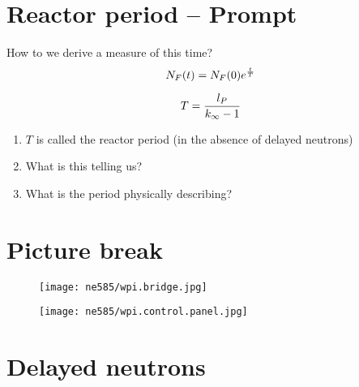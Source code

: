 \documentclass[aspectratio=1610,pdftex,dvipsnames,compress,xcolor={dvipsnames}]{beamer}
\begin{document}
\section{Reactor period -- Prompt}


\addtocounter{framenumber}{-1} 
\begin{frame}{How to we derive a measure of this time?}
    \begin{equation}
        \LARGE
        N_F(t)=N_F(0)e^{\frac{t}{T}}
    \end{equation}

    \begin{equation}
        \LARGE
        T = \frac{l_P}{k_\infty - 1}
    \end{equation}

    \vspace*{\fill}

    \begin{enumerate}[series=outerlist,topsep=0pt,itemsep=21pt,leftmargin=*,label=(\arabic*)]
        \item[]$T$ is called the reactor period (in the absence of delayed neutrons)
        \item[]What is this telling us?
        \item[]What is the period physically describing?
    \end{enumerate}
\end{frame}


\section{Picture break}


\addtocounter{framenumber}{-1} 
\begin{frame}{}
    \begin{figure}
        \centering
        \texttt{[image: ne585/wpi.bridge.jpg]}
    \end{figure}
\end{frame}


\begin{frame}{}
    \begin{figure}
        \centering
        \texttt{[image: ne585/wpi.control.panel.jpg]}
    \end{figure}
\end{frame}


\section{Delayed neutrons}
\end{document}
